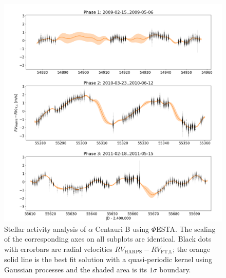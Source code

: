 \begin{figure}[tbp]
\centering
\includegraphics[width = 1.0 \linewidth]
{./Figures/Methods/Alpha_Cen_B.png}
\caption[$\alpha$ Centauri B: stellar activity analysis]
		{Stellar activity analysis of $\alpha$ Centauri B using $\mathit{\Phi}$ESTA. The scaling of the corresponding axes on all subplots are identical. Black dots with errorbars are radial velocities $RV_\text{HARPS} - RV_\text{FT,L}$; the orange solid line is the best fit solution with a quasi-periodic kernel using Gaussian processes and the shaded area is its $1\sigma$ boundary.}
\label{fig:Alpha_Cen_B}
\end{figure} 

